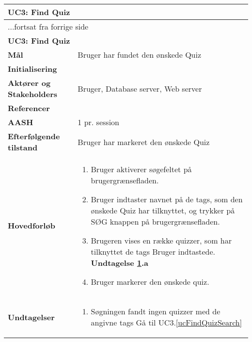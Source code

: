\begin{center} \centering \label{ucFindQuiz}
	\begin{longtable}{|p{4.6cm}|p{9.4cm}|}  %
	\hline
		\multicolumn{2}{|l|}{\textbf{UC3: Find Quiz}} \\\hline
		\endfirsthead
		
		\multicolumn{2}{l}{...fortsat fra forrige side} \\ \hline %
		\multicolumn{2}{|l|}{\textbf{UC3: Find Quiz}} \\\hline
		\endhead	
		
		\textbf{Mål}					& Bruger har fundet den ønskede Quiz
		\\\hline
		\textbf{Initialisering}			& %
		\\\hline
		\textbf{Aktører og Stakeholders}	&Bruger, Database server, Web server
		\\\hline 
		\textbf{Referencer}				& %
		\\\hline
		\textbf{AASH}					& 1 pr. session
		\\\hline
		\textbf{Efterfølgende tilstand}	& Bruger har markeret den ønskede Quiz
		\\\hline
		\textbf{Hovedforløb}					
			&\begin{enumerate}
				\item Bruger aktiverer søgefeltet på brugergrænsefladen.
				\item \label{ucFindQuizSearch} Bruger indtaster navnet på de tags, %
				som den ønskede Quiz har tilknyttet, og trykker på SØG knappen på brugergrænsefladen.
				\item \label{ucFindQuizNoResults} Brugeren vises en række quizzer, som har tilknyttet de tags Bruger indtastede.
				\textbf{Undtagelse \ref{ucFindQuizNoResults}.a}
				\item Bruger markerer den ønskede quiz.
				
			\end{enumerate}\\\hline
		\textbf{Undtagelser}
			&\begin{enumerate} [label=\ref{ucFindQuizNoResults}.a]
				\item Søgningen fandt ingen quizzer med de angivne tags %
				\subitem Gå til UC3.\ref{ucFindQuizSearch}
			\end{enumerate}
						
			\\\hline
	\end{longtable} 
\end{center}